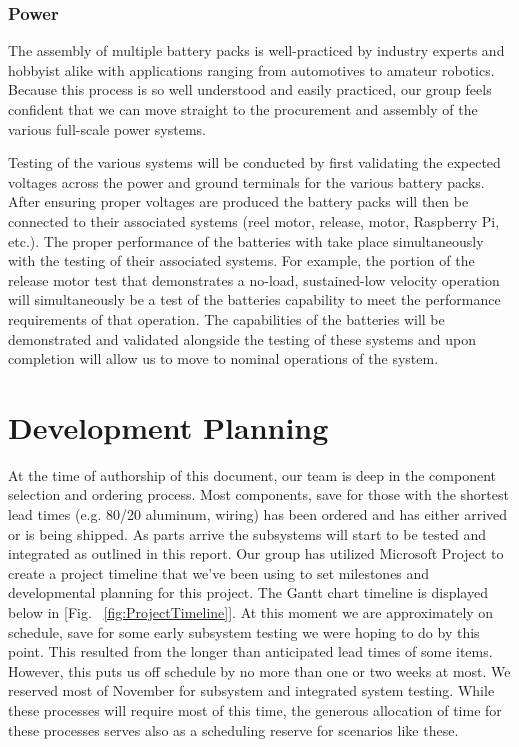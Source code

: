 
\subsubsection{Power}

\indent\indent The assembly of multiple battery packs is well-practiced by industry experts and hobbyist alike with applications ranging from automotives to amateur robotics. Because this process is so well understood and easily practiced, our group feels confident that we can move straight to the procurement and assembly of the various full-scale power systems. 

Testing of the various systems will be conducted by first validating the expected voltages across the power and ground terminals for the various battery packs. After ensuring proper voltages are produced the battery packs will then be connected to their associated systems (reel motor, release, motor, Raspberry Pi, etc.). The proper performance of the batteries with take place simultaneously with the testing of their associated systems. For example, the portion of the release motor test that demonstrates a no-load, sustained-low velocity operation will simultaneously be a test of the batteries capability to meet the performance requirements of that operation. The capabilities of the batteries will be demonstrated and validated alongside the testing of these systems and upon completion will allow us to move to nominal operations of the system. 


\section{Development Planning}

\indent\indent At the time of authorship of this document, our team is deep in the component selection and ordering process. Most components, save for those with the shortest lead times (e.g. 80/20 aluminum, wiring) has been ordered and has either arrived or is being shipped. As parts arrive the subsystems will start to be tested and integrated as outlined in this report. Our group has utilized Microsoft Project to create a project timeline that we've been using to set milestones and developmental planning for this project. The Gantt chart timeline is displayed below in [Fig. ~\ref{fig:ProjectTimeline}]. At this moment we are approximately on schedule, save for some early subsystem testing we were hoping to do by this point. This resulted from the longer than anticipated lead times of some items. However, this puts us off schedule by no more than one or two weeks at most. We reserved most of November for subsystem and integrated system testing. While these processes will require most of this time, the generous allocation of time for these processes serves also as a scheduling reserve for scenarios like these. 

